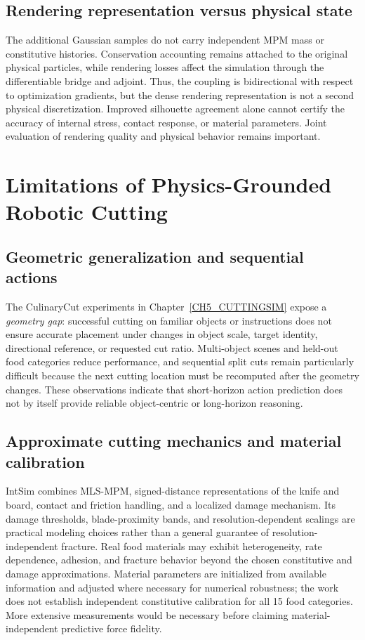 \subsection{Rendering representation versus physical state}
The additional Gaussian samples do not carry independent MPM mass or constitutive histories. Conservation accounting remains attached to the original physical particles, while rendering losses affect the simulation through the differentiable bridge and adjoint. Thus, the coupling is bidirectional with respect to optimization gradients, but the dense rendering representation is not a second physical discretization. Improved silhouette agreement alone cannot certify the accuracy of internal stress, contact response, or material parameters. Joint evaluation of rendering quality and physical behavior remains important.

\section{Limitations of Physics-Grounded Robotic Cutting}
\label{subsec:lim-cutting}

\subsection{Geometric generalization and sequential actions}
The CulinaryCut experiments in Chapter~\ref{CH5_CUTTINGSIM} expose a \emph{geometry gap}: successful cutting on familiar objects or instructions does not ensure accurate placement under changes in object scale, target identity, directional reference, or requested cut ratio. Multi-object scenes and held-out food categories reduce performance, and sequential split cuts remain particularly difficult because the next cutting location must be recomputed after the geometry changes. These observations indicate that short-horizon action prediction does not by itself provide reliable object-centric or long-horizon reasoning.

\subsection{Approximate cutting mechanics and material calibration}
IntSim combines MLS-MPM, signed-distance representations of the knife and board, contact and friction handling, and a localized damage mechanism. Its damage thresholds, blade-proximity bands, and resolution-dependent scalings are practical modeling choices rather than a general guarantee of resolution-independent fracture. Real food materials may exhibit heterogeneity, rate dependence, adhesion, and fracture behavior beyond the chosen constitutive and damage approximations. Material parameters are initialized from available information and adjusted where necessary for numerical robustness; the work does not establish independent constitutive calibration for all 15 food categories. More extensive measurements would be necessary before claiming material-independent predictive force fidelity.


